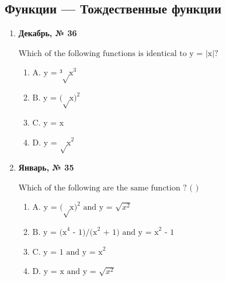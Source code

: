\subsection*{Функции — Тождественные функции}
\begin{enumerate}
\item \textbf{Декабрь, № 36} \par \smallskip
$\displaystyle \text{Which of the following functions is identical to y = |x|?}$
\begin{enumerate}
\item $\displaystyle \text{A. y = ³√x}^{3}$
\item $\displaystyle \text{B. y = (√x)}^{2}$
\item $\displaystyle \text{C. y = x}$
\item $\displaystyle \text{D. y = √x}^{2}$
\end{enumerate}
\item \textbf{Январь, № 35} \par \smallskip
$\displaystyle \text{Which of the following are the same function ? ( )}$
\begin{enumerate}
\item $\displaystyle \text{A. y = (√x)}^{2}\text{  and y = }\sqrt{x^{2}}$
\item $\displaystyle \text{B. y = (x}^{4}\text{ - 1)/(x}^{2}\text{ + 1)   and y = x}^{2}\text{ - 1}$
\item $\displaystyle \text{C. y = 1  and y = x}^{2}$
\item $\displaystyle \text{D. y = x  and y = }\sqrt{x^{2}}$
\end{enumerate}
\end{enumerate}

